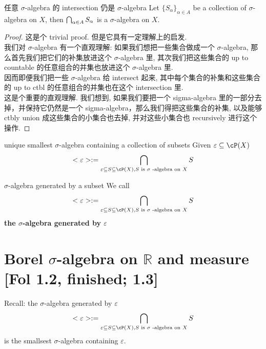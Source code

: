 \begin{lemma}{任意 $\sigma$-algebra 的 intersection 仍是 $\sigma$-algebra}
Let $\{S_\alpha \}_{\alpha \in A}$ be a collection of $\sigma$-algebra on $X$, then $\bigcap_{\alpha \in A} S_\alpha$ is a $\sigma$-algebra on $X$. 
\end{lemma}
\begin{proof}
    这是个 trivial proof. 但是它具有一定理解上的启发.\\
    我们对 $\sigma$-algebra 有一个直观理解: 如果我们想把一些集合做成一个 $\sigma$-algebra, 那么首先我们把它们的补集放进这个 $\sigma$-algebra 里, 其次我们把这些集合的 up to countable 的任意组合的并集也放进这个 $\sigma$-algebra 里.\\
    因而即便我们把一些 $\sigma$-algebra 给 intersect 起来, 其中每个集合的补集和这些集合的 up to ctbl 的任意组合的并集也在这个 intersection 里.\\
    这是个重要的直观理解. 我们想到, 如果我们要把一个 sigma-algebra 里的一部分去掉，并保持它仍然是一个 sigma-algebra，那么我们得把这些集合的补集, 以及能够 ctbly union 成这些集合的小集合也去掉, 并对这些小集合也 recursively 进行这个操作.
\end{proof}

\begin{corollary}{unique smallest $\sigma$-algebra containing a collection of subsets}
    Given $\varepsilon  \sub \cP(X)$
    $$
    <\varepsilon> := \intsec_{\varepsilon  \sub S \sub \cP(X), \newline S \text{ is }\sigma \text{ -algebra on } X} S
    $$
\end{corollary}

\begin{definition}{$\sigma$-algebra generated by a subset}
We call  $$
    <\varepsilon> := \intsec_{\varepsilon  \sub S \sub \cP(X), \newline S \text{ is }\sigma \text{ -algebra on } X} S
    $$ \textbf{the $\sigma$-algebra generated by $\varepsilon$ }
\end{definition}

\section{Borel $\sigma$-algebra on $\mathbb{R}$ and measure [Fol 1.2, finished; 1.3]}
\noindent Recall: the $\sigma$-algebra generated by $\varepsilon$
    $$
    <\varepsilon> := \intsec_{\varepsilon  \sub S \sub \cP(X), \newline S \text{ is }\sigma \text{ -algebra on } X} S
    $$ is the smallsest $\sigma$-algebra containing $\varepsilon$.


